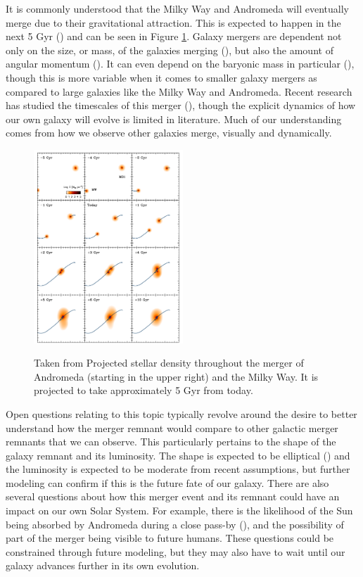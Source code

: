 \documentclass[twocolumn]{aastex631}
\begin{document}
It is commonly understood that the Milky Way and Andromeda will eventually merge due to their gravitational attraction. This is expected to happen in the next 5 Gyr (\cite{Cox_2008}) and can be seen in Figure \ref{Figure 1}. Galaxy mergers are dependent not only on the size, or mass, of the galaxies merging (\cite{10.1111/j.1365-2966.2010.16268.x}), but also the amount of angular momentum (\cite{2008ApJS..175..356H}). It can even depend on the baryonic mass in particular (\cite{10.1111/j.1365-2966.2010.16268.x}), though this is more variable when it comes to smaller galaxy mergers as compared to large galaxies like the Milky Way and Andromeda. Recent research has studied the timescales of this merger (\cite{Cox_2008}), though the explicit dynamics of how our own galaxy will evolve is limited in literature. Much of our understanding comes from how we observe other galaxies merge, visually and dynamically. 

\begin{figure}
    \centering
    \includegraphics[width = 0.5\textwidth]{Figure 2 from Cox (2008).png}
    \label{Figure 1}
    \caption{Taken from \cite{Cox_2008} Projected stellar density throughout the merger of Andromeda (starting in the upper right) and the Milky Way. It is projected to take approximately 5 Gyr from today. }
\end{figure}

Open questions relating to this topic typically revolve around the desire to better understand how the merger remnant would compare to other galactic merger remnants that we can observe. This particularly pertains to the shape of the galaxy remnant and its luminosity. The shape is expected to be elliptical (\cite{Cox_2008}) and the luminosity is expected to be moderate from recent assumptions, but further modeling can confirm if this is the future fate of our galaxy. There are also several questions about how this merger event and its remnant could have an impact on our own Solar System. For example, there is the likelihood of the Sun being absorbed by Andromeda during a close pass-by (\cite{Cox_2008}), and the possibility of part of the merger being visible to future humans. These questions could be constrained through future modeling, but they may also have to wait until our galaxy advances further in its own evolution. 
\end{document}
